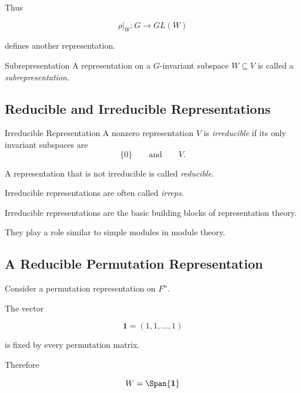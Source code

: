 Thus

\[ \rho|_W:G\to GL(W) \]

defines another representation.

\begin{definitionbox}{Subrepresentation}
A representation on a \(G\)-invariant subspace \(W\subseteq V\) is called a
\emph{subrepresentation}.
\end{definitionbox}

\subsection{Reducible and Irreducible Representations}
\label{subsec:irreducible-representations}

\begin{definitionbox}{Irreducible Representation}
A nonzero representation \(V\) is \emph{irreducible} if its only invariant
subspaces are
\[ \{0\}\qquad\text{and}\qquad V. \]
\end{definitionbox}

A representation that is not irreducible is called \emph{reducible}.

Irreducible representations are often called \emph{irreps}.

\begin{conceptbox}
Irreducible representations are the basic building blocks of representation
theory.

They play a role similar to simple modules in module theory.
\end{conceptbox}

\subsection{A Reducible Permutation Representation}
\label{subsec:reducible-permutation-representation}

Consider a permutation representation on \(F^n\).

The vector

\[ \mathbf{1}=(1,1,\ldots,1) \]

is fixed by every permutation matrix.

Therefore

\[ W=\Span\{\mathbf{1}\} \]

